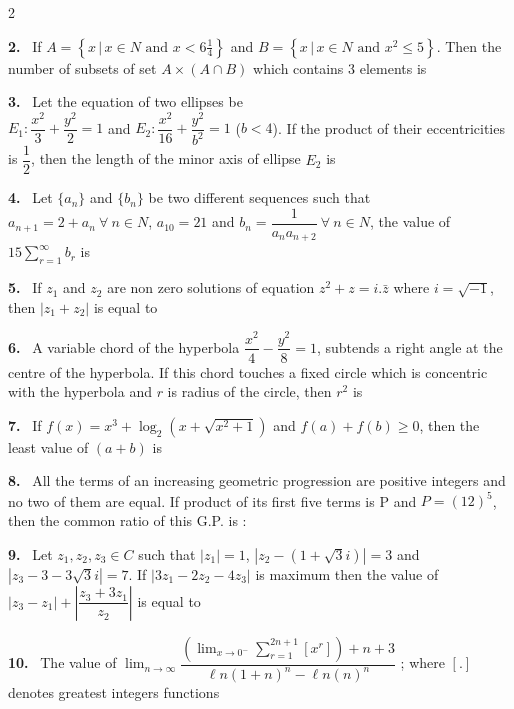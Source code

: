 \documentclass[10pt]{extarticle}
\newcommand{\qn}[1]{\par\smallskip\noindent\textbf{#1.}~}
\begin{document}
\begin{multicols}{2}
\qn{2} If $A=\left\{x\,|\,x\in N\text{ and }x<6\tfrac14\right\}$ and $B=\left\{x\,|\,x\in N\text{ and }x^2\leqslant5\right\}$. Then the number of subsets of set $A\times(A\cap B)$ which contains 3 elements is

\qn{3} Let the equation of two ellipses be\\
$E_1:\dfrac{x^2}{3}+\dfrac{y^2}{2}=1$ and $E_2:\dfrac{x^2}{16}+\dfrac{y^2}{b^2}=1$ ($b<4$). If the product of their eccentricities is $\dfrac12$, then the length of the minor axis of ellipse $E_2$ is

\qn{4} Let $\{a_n\}$ and $\{b_n\}$ be two different sequences such that $a_{n+1}=2+a_n\ \forall\ n\in N$, $a_{10}=21$ and $b_n=\dfrac{1}{a_na_{n+2}}\ \forall\ n\in N$, the value of $15\displaystyle\sum_{r=1}^{\infty}b_r$ is

\qn{5} If $z_1$ and $z_2$ are non zero solutions of equation $z^2+z=i.\bar z$ where $i=\sqrt{-1}$, then $|z_1+z_2|$ is equal to

\qn{6} A variable chord of the hyperbola $\dfrac{x^2}{4}-\dfrac{y^2}{8}=1$, subtends a right angle at the centre of the hyperbola. If this chord touches a fixed circle which is concentric with the hyperbola and $r$ is radius of the circle, then $r^2$ is

\qn{7} If $f(x)=x^3+\log_2\left(x+\sqrt{x^2+1}\right)$ and $f(a)+f(b)\geq0$, then the least value of $(a+b)$ is

\qn{8} All the terms of an increasing geometric progression are positive integers and no two of them are equal. If product of its first five terms is P and $P=(12)^5$, then the common ratio of this G.P. is :

\qn{9} Let $z_1,z_2,z_3\in C$ such that $|z_1|=1$, $\left|z_2-\left(1+\sqrt3i\right)\right|=3$ and $\left|z_3-3-3\sqrt3i\right|=7$. If $|3z_1-2z_2-4z_3|$ is maximum then the value of $|z_3-z_1|+\left|\dfrac{z_3+3z_1}{z_2}\right|$ is equal to

\qn{10} The value of $\displaystyle\lim_{n\to\infty}\dfrac{\left(\displaystyle\lim_{x\to0^-}\sum_{r=1}^{2n+1}[x^r]\right)+n+3}{\ell n(1+n)^n-\ell n(n)^n}$ ; where $[.]$ denotes greatest integers functions

\end{multicols}
\end{document}
